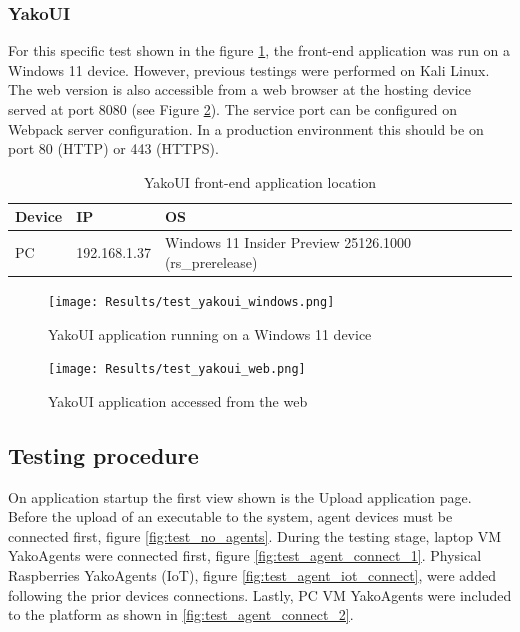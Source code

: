         \subsubsection{YakoUI}
            For this specific test shown in the figure \ref{fig:test_yakoui_windows}, the front-end application was run on a Windows 11 device. However, previous testings were performed on Kali Linux. The web version is also accessible from a web browser at the hosting device served at port 8080 (see Figure \ref{fig:test_yakoui_web}). The service port can be configured on Webpack server configuration. In a production environment this should be on port 80 (HTTP) or 443 (HTTPS).
            \begin{table}[H]
                \centering
                \caption{YakoUI front-end application location}
                \label{tab:test_yakoagentsiot}
                \begin{tabularx}{\linewidth}{|l|l|X|X|l|X|}
                    \hline
                    \rowcolor[HTML]{C0C0C0}
                    \textbf{Device} & \textbf{IP} & \textbf{OS} \\\hline
                    PC & 192.168.1.37 & Windows 11 Insider Preview 25126.1000 (rs\_prerelease)  \\ \hline
                \end{tabularx}
            \end{table}
            
            \begin{figure}[H]
                \centering
                \texttt{[image: Results/test\_yakoui\_windows.png]}
                \caption{YakoUI application running on a Windows 11 device}
                \label{fig:test_yakoui_windows}
            \end{figure}
            
            \begin{figure}[H]
                \centering
                \texttt{[image: Results/test\_yakoui\_web.png]}
                \caption{YakoUI application accessed from the web}
                \label{fig:test_yakoui_web}
            \end{figure}
    
    \subsection{Testing procedure}
        On application startup the first view shown is the Upload application page. Before the upload of an executable to the system, agent devices must be connected first, figure \ref{fig:test_no_agents}. During the testing stage, laptop VM YakoAgents were connected first, figure \ref{fig:test_agent_connect_1}. Physical Raspberries YakoAgents (IoT), figure \ref{fig:test_agent_iot_connect}, were added following the prior devices connections. Lastly, PC VM YakoAgents were included to the platform as shown in \ref{fig:test_agent_connect_2}.
        
